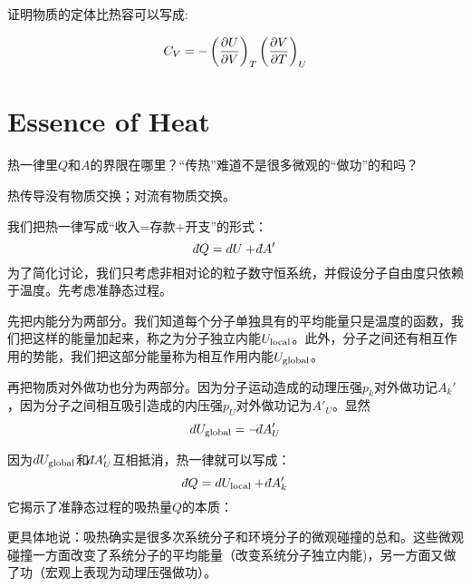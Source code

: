 \documentclass[CJK]{beamer}
\begin{document}
\begin{frame}
\bch
{}

证明物质的定体比热容可以写成:

$$
C_V =  - \left(\frac{\partial U}{\partial V}\right)_{T} \left(\frac{\partial V}{\partial T}\right)_{U} 
$$

\ech
\end{frame}


\section{Essence of Heat}

\begin{frame}
\bch


热一律里$Q$和$A$的界限在哪里？“传热”难道不是很多微观的“做功”的和吗？

\ech
\end{frame}

\begin{frame}
\bch
热传导没有物质交换；对流有物质交换。
\ech
\end{frame}

\begin{frame}
\bch
我们把热一律写成“收入=存款+开支”的形式：
$$ \dbar Q =  d U + \dbar A'$$
为了简化讨论，我们只考虑非相对论的粒子数守恒系统，并假设分子自由度只依赖于温度。先考虑准静态过程。

\skipline

先把内能分为两部分。我们知道每个分子单独具有的平均能量只是温度的函数，我们把这样的能量加起来，称之为{\blue 分子独立内能$U_{\rm local}$}。此外，分子之间还有相互作用的势能，我们把这部分能量称为{\blue 相互作用内能$U_{\rm global}$}。


再把物质对外做功也分为两部分。因为分子运动造成的{\blue 动理压强$p_k$对外做功记$ A_k'$}，因为分子之间相互吸引造成的{\blue 内压强$p_U$对外做功记为$ A'_U$}。显然
{\blue
$$ d U_{\rm global} = - \dbar A'_U$$
}
\ech
\end{frame}


\begin{frame}
\bch
因为$d U_{\rm global}$和$\dbar A'_U$互相抵消，热一律就可以写成：
$$ \dbar Q = d U_{\rm local}  +\dbar A'_k  $$
它揭示了准静态过程的吸热量$Q$的本质：


更具体地说：吸热确实是很多次系统分子和环境分子的微观碰撞的总和。这些微观碰撞一方面改变了系统分子的平均能量（改变系统分子独立内能)，另一方面又做了功（宏观上表现为动理压强做功）。


\ech
\end{frame}
\end{document}
